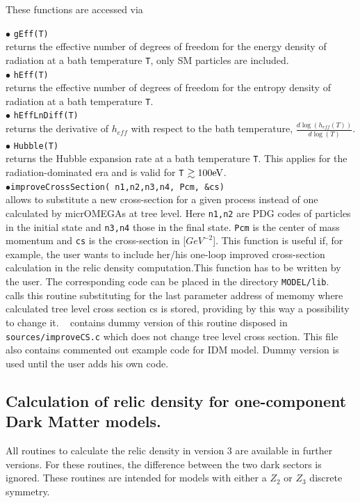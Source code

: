 \documentclass[12pt,a4paper]{article}
\begin{document}
These functions are accessed via

\noindent$\bullet$ \verb|gEff(T)|\\
 returns the effective number of degrees of freedom for the energy density of radiation at a bath temperature \verb|T|,   only SM particles are included.\\
\noindent$\bullet$ \verb|hEff(T)|\\ returns the effective number of degrees of freedom for the entropy density of radiation at a bath temperature \verb|T|.\\
\noindent$\bullet$ \verb|hEffLnDiff(T)|\\ returns the derivative of $h_{eff}$ with respect to the bath temperature, $\frac{d\log(h_{eff}(T))}{d\log(T)}$.\\
\noindent$\bullet$ \verb|Hubble(T)|\\ returns the Hubble expansion rate at a bath temperature \verb|T|. This applies for the radiation-dominated era and is valid for \verb|T| $\gtrsim 100 {\rm eV}$.\\


\noindent$\bullet$\verb|improveCrossSection( n1,n2,n3,n4, Pcm, &cs)|\\
allows to substitute a new cross-section for a given process instead of one calculated by
micrOMEGAs at tree level.  Here \verb|n1,n2| are PDG codes  of particles in the initial state and
\verb|n3,n4| those in the final state. \verb|Pcm| is the center of mass momentum and \verb|cs| is the cross-section in
[$GeV^{-2}$]. This function is useful if, for example, the user wants to include her/his one-loop improved cross-section 
calculation in the relic density computation.This function has to be written by the user. 
The corresponding code can be placed in the directory \verb|MODEL/lib|. \micro~   calls this routine substituting
for the last parameter address of memomy where calculated tree level cross section cs is stored,
providing by this way a possibility to change it.
 \micro~  contains dummy version of this routine  disposed in 
\verb|sources/improveCS.c| which does  not change tree level   cross section. This file also  contains
commented out example code for IDM model. Dummy version is used until the user adds   his own code. 


\subsection{Calculation of relic density for one-component Dark Matter models.}
\label{sec:one_component}
All routines to calculate the relic density in  version 3 are  available in further versions. For these routines,  the difference between 
the two dark sectors is ignored. These routines are intended for models with either a $Z_2$ or $Z_3$ discrete symmetry.
  
\end{document}
